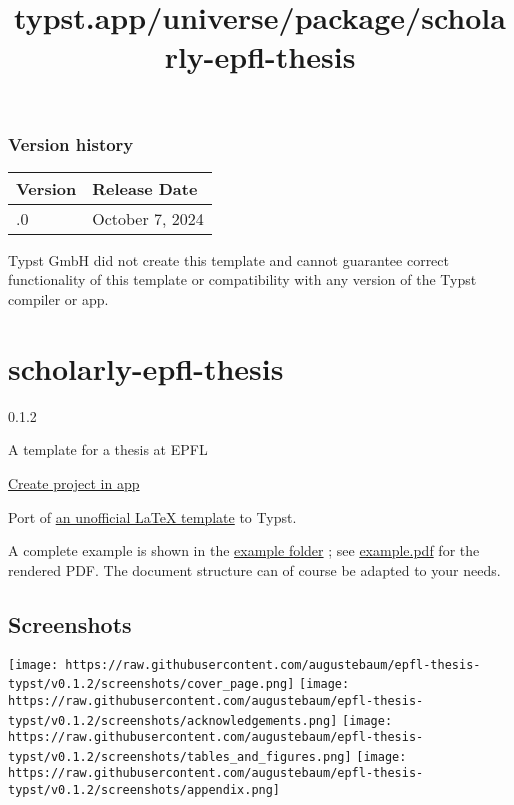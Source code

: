 \label{versions}
\subsubsection{Version history}\label{version-history}

\begin{longtable}[]{@{}ll@{}}
\toprule\noalign{}
Version & Release Date \\
\midrule\noalign{}
\endhead
\bottomrule\noalign{}
\endlastfoot
0.1.0 & October 7, 2024 \\
\end{longtable}

Typst GmbH did not create this template and cannot guarantee correct
functionality of this template or compatibility with any version of the
Typst compiler or app.


\title{typst.app/universe/package/scholarly-epfl-thesis}

\label{banner}
\label{template-thumbnail}

\section{scholarly-epfl-thesis}\label{scholarly-epfl-thesis}

{ 0.1.2 }

A template for a thesis at EPFL

\href{/app?template=scholarly-epfl-thesis&version=0.1.2}{Create project
in app}

\label{readme}
Port of
\href{https://www.overleaf.com/latex/templates/swiss-federal-institute-of-technology-in-lausanne-epfl-phd-thesis/dhcgtppybcwv}{an
unofficial LaTeX template} to Typst.

A complete example is shown in the
\href{https://github.com/augustebaum/epfl-thesis-typst/blob/v0.1.2/example}{example
folder} ; see
\href{https://github.com/augustebaum/epfl-thesis-typst/blob/v0.1.2/example/main.pdf}{example.pdf}
for the rendered PDF. The document structure can of course be adapted to
your needs.

\subsection{Screenshots}\label{screenshots}

\texttt{[image: https://raw.githubusercontent.com/augustebaum/epfl-thesis-typst/v0.1.2/screenshots/cover\_page.png]}
\texttt{[image: https://raw.githubusercontent.com/augustebaum/epfl-thesis-typst/v0.1.2/screenshots/acknowledgements.png]}
\texttt{[image: https://raw.githubusercontent.com/augustebaum/epfl-thesis-typst/v0.1.2/screenshots/tables\_and\_figures.png]}
\texttt{[image: https://raw.githubusercontent.com/augustebaum/epfl-thesis-typst/v0.1.2/screenshots/appendix.png]}

